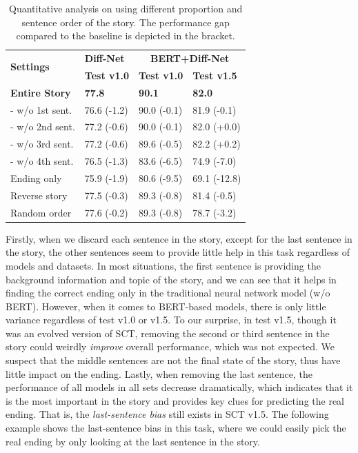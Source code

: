 \documentclass[letterpaper]{article} %
\begin{document}
\begin{table}[tbp]
\small
\begin{center}
\begin{tabular}{p{1.9cm} l l l}
\toprule
\multirow{2}{*}{\bf Settings} 	& {\centering \bf Diff-Net} & \multicolumn{2}{c}{\centering \bf BERT+Diff-Net} \\
& {\bf Test v1.0} & {\bf Test v1.0} & {\bf Test v1.5}  \\
\midrule
\bf Entire Story 		 		& \bf 77.8 & \bf 90.1 & \bf 82.0 \\
- w/o 1st sent. 				& 76.6 {\small(-1.2)} & 90.0 {\small(-0.1)} & 81.9 {\small(-0.1)} \\
- w/o 2nd sent. 				& 77.2 {\small(-0.6)} & 90.0 {\small(-0.1)} &  82.0 {\small(+0.0)} \\
- w/o 3rd sent. 				& 77.2 {\small(-0.6)} & 89.6 {\small(-0.5) }& 82.2 {\small(+0.2)} \\
- w/o 4th sent. 				& 76.5 {\small(-1.3)} & 83.6 {\small(-6.5)} &  74.9 {\small(-7.0)} \\
\midrule
Ending only		  			& 75.9 {\small(-1.9)} & 80.6 {\small(-9.5)} & 69.1 {\small(-12.8)} \\
Reverse story					& 77.5 {\small(-0.3)} & 89.3 {\small(-0.8)} & 81.4 {\small(-0.5)} \\
Random order		 			& 77.6 {\small(-0.2)} & 89.3 {\small(-0.8)} & 78.7 {\small(-3.2)} \\
\bottomrule
\end{tabular}
\end{center}
\caption{\label{ablation-context} Quantitative analysis on using different proportion and sentence order of the story. The performance gap compared to the baseline is depicted in the bracket.}
\end{table}

Firstly, when we discard each sentence in the story, except for the last sentence in the story, the other sentences seem to provide little help in this task regardless of models and datasets.
In most situations, the first sentence is providing the background information and topic of the story, and we can see that it helps in finding the correct ending only in the traditional neural network model (w/o BERT). However, when it comes to BERT-based models, there is only little variance regardless of test v1.0 or v1.5.
To our surprise, in test v1.5, though it was an evolved version of SCT, removing the second or third sentence in the story could weirdly {\em improve} overall performance, which was not expected.
We suspect that the middle sentences are not the final state of the story, thus have little impact on the ending.
Lastly, when removing the last sentence, the performance of all models in all sets decrease dramatically, which indicates that it is the most important in the story and provides key clues for predicting the real ending.
That is, the {\em last-sentence bias} still exists in SCT v1.5.
The following example shows the last-sentence bias in this task, where we could easily pick the real ending by only looking at the last sentence in the story.
\end{document}
